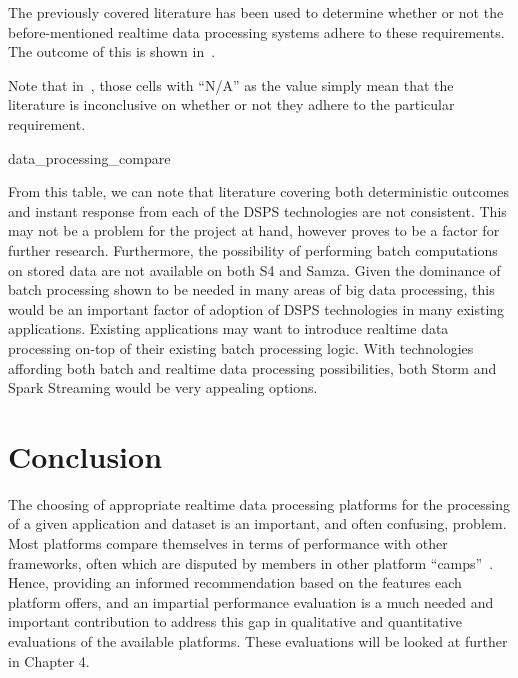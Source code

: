The previously covered literature has been used to determine whether or not the before-mentioned realtime data processing
systems adhere to these requirements. The outcome of this is shown in~.

Note that in~, those cells with ``N/A'' as the value simply mean that the literature
is inconclusive on whether or not they adhere to the particular requirement.

{data_processing_compare}

From this table, we can note that literature covering both deterministic outcomes and instant response from each of the DSPS technologies
are not consistent. This may not be a problem for the project at hand, however proves to be a factor for further research.
Furthermore, the possibility of performing batch computations on stored data are not available on both S4 and Samza. Given
the dominance of batch processing shown to be needed in many areas of big data processing, this would be an important
factor of adoption of DSPS technologies in many existing applications. Existing applications may want to introduce realtime
data processing on-top of their existing batch processing logic. With technologies affording both batch and realtime data processing
possibilities, both Storm and Spark Streaming would be very appealing options.




\section{Conclusion} %
\label{sec:conclusion_litrev}

The choosing of appropriate realtime data processing platforms for the processing of a given application and dataset
is an important, and often confusing, problem. Most platforms compare themselves in terms of performance with other
frameworks, often which are disputed by members in other platform ``camps''~\cite{web_slideshare_b,web_slideshare_a}.
Hence, providing an informed recommendation based on the features each platform offers, and an impartial performance
evaluation is a much needed and important contribution to address this gap in qualitative and quantitative evaluations
of the available platforms. These evaluations will be looked at further in Chapter 4.

